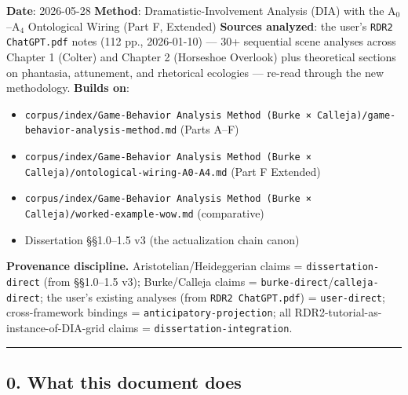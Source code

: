 \documentclass[11pt]{report}
\begin{document}
\textbf{Date}: 2026-05-28 \textbf{Method}: Dramatistic-Involvement Analysis (DIA) with the A$_0$–A$_4$ Ontological Wiring (Part F, Extended) \textbf{Sources analyzed}: the user's \texttt{RDR2 ChatGPT.\discretionary{}{}{}pdf} notes (112 pp., 2026-01-10) — 30+ sequential scene analyses across Chapter 1 (Colter) and Chapter 2 (Horseshoe Overlook) plus theoretical sections on phantasia, attunement, and rhetorical ecologies — re-read through the new methodology. \textbf{Builds on}:


\begin{itemize}
\item \texttt{corpus/\discretionary{}{}{}index/\discretionary{}{}{}Game-\discretionary{}{}{}Behavior Analysis Method (Burke × Calleja)/\discretionary{}{}{}game-\discretionary{}{}{}behavior-\discretionary{}{}{}analysis-\discretionary{}{}{}method.\discretionary{}{}{}md} (Parts A–F)
\item \texttt{corpus/\discretionary{}{}{}index/\discretionary{}{}{}Game-\discretionary{}{}{}Behavior Analysis Method (Burke × Calleja)/\discretionary{}{}{}ontological-\discretionary{}{}{}wiring-\discretionary{}{}{}A0-\discretionary{}{}{}A4.\discretionary{}{}{}md} (Part F Extended)
\item \texttt{corpus/\discretionary{}{}{}index/\discretionary{}{}{}Game-\discretionary{}{}{}Behavior Analysis Method (Burke × Calleja)/\discretionary{}{}{}worked-\discretionary{}{}{}example-\discretionary{}{}{}wow.\discretionary{}{}{}md} (comparative)
\item Dissertation §§1.0–1.5 v3 (the actualization chain canon)
\end{itemize}


\textbf{Provenance discipline.} Aristotelian/Heideggerian claims = \texttt{dissertation-\discretionary{}{}{}direct} (from §§1.0–1.5 v3); Burke/Calleja claims = \texttt{burke-\discretionary{}{}{}direct}/\texttt{calleja-\discretionary{}{}{}direct}; the user's existing analyses (from \texttt{RDR2 ChatGPT.\discretionary{}{}{}pdf}) = \texttt{user-\discretionary{}{}{}direct}; cross-framework bindings = \texttt{anticipatory-\discretionary{}{}{}projection}; all RDR2-tutorial-as-instance-of-DIA-grid claims = \texttt{dissertation-\discretionary{}{}{}integration}.


\vspace{0.4em}\hrule\vspace{0.8em}


\subsection{0. What this document does}
\end{document}
